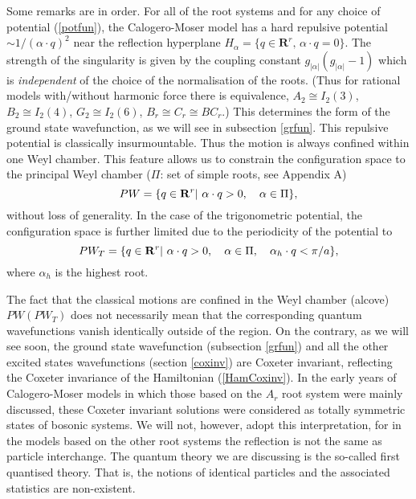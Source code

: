 \documentclass[a4paper,12pt]{article}
\begin{document}
Some remarks are in order. For all of the root systems and for
any choice of potential (\ref{potfun}),
the  Calogero-Moser model has a hard repulsive potential \(\sim
{1/{(\alpha\cdot q)^2}}\) near the reflection hyperplane
\(H_{\alpha}=\{q\in\mathbf{R}^{r},\, \alpha\cdot q=0\}\).
The strength of the singularity is given by
the coupling constant \(g_{|\alpha|}(g_{|\alpha|}-1)\)
which is {\em independent\/} of the choice of the normalisation of the
roots.
(Thus for rational models with/without harmonic force there is equivalence,
\(A_2\cong I_2(3)\), \(B_2\cong I_2(4)\), \(G_2\cong I_2(6)\),
\(B_r\cong C_r\cong
BC_r\).) This determines the form of the ground state wavefunction, as we
will see in subsection \ref{grfun}.
This repulsive potential is classically insurmountable.
Thus the motion is always
confined within one Weyl chamber.
This  feature allows us to constrain the configuration space to
the principal Weyl chamber (\(\Pi\): set of simple roots, see Appendix A)
\begin{equation}
   PW=\{q\in{\bf R}^r|\ \alpha\cdot q>0,\quad \alpha\in\Pi\},
   \label{PW}
\end{equation}
without loss of generality.
In the case of the trigonometric potential, the configuration space is
further
limited due to the periodicity of the potential to
\begin{equation}
   PW_T=\{q\in{\bf R}^r|\ \alpha\cdot q>0,\quad \alpha\in\Pi,
   \quad \alpha_h\cdot q<\pi/a\},
   \label{PWT}
\end{equation}
where \(\alpha_h\) is the highest root.

The fact that the classical motions are confined in the Weyl
chamber (alcove) \(PW (PW_T)\)  does not necessarily mean that the
corresponding quantum wavefunctions vanish identically outside of
the region.
On the contrary, as we will see soon, the ground state wavefunction
(subsection \ref{grfun}) and all the other excited states
wavefunctions (section \ref{coxinv}) are Coxeter invariant, reflecting
the Coxeter invariance of the Hamiltonian (\ref{HamCoxinv}).
In the early years of Calogero-Moser models in which those based on
the \(A_r\) root system were mainly discussed, these Coxeter invariant
solutions were considered as totally symmetric states of bosonic
systems. We will not, however, adopt this interpretation, for in
the models based on the other root systems the reflection is not the
same as particle interchange.
The quantum theory we are discussing is the so-called first quantised
theory.
That is, the notions of identical particles and the associated statistics
are non-existent.
\end{document}

